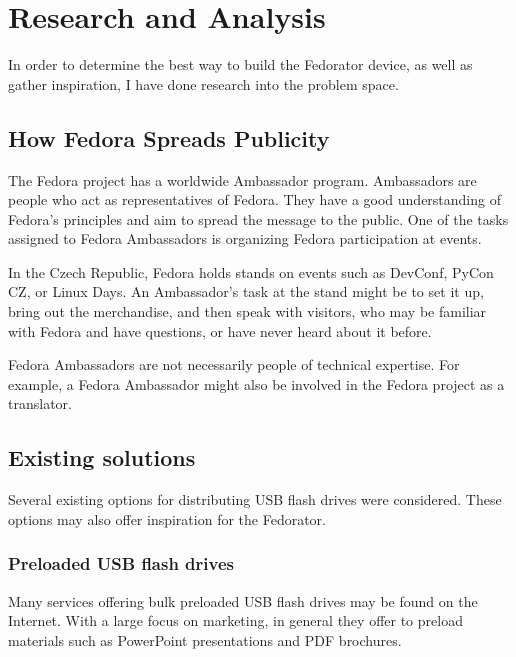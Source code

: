 \chapter{Research and Analysis}
    In order to determine the best way to build the Fedorator device, as well as gather inspiration, I have done research into the problem space.
    
    \section{How Fedora Spreads Publicity}
        The Fedora project has a worldwide Ambassador program.  Ambassadors are people who act as representatives of Fedora.  They have a good understanding of Fedora's principles and aim to spread the message to the public\cite{fedora-ambassadors}.  One of the tasks assigned to Fedora Ambassadors is organizing Fedora participation at events.
        
        In the Czech Republic, Fedora holds stands on events such as DevConf\cite{devconf}, PyCon CZ\cite{pycon-cz}, or Linux Days\cite{linux-days}.  An Ambassador's task at the stand might be to set it up, bring out the merchandise, and then speak with visitors, who may be familiar with Fedora and have questions, or have never heard about it before.
        
        Fedora Ambassadors are not necessarily people of technical expertise.  For example, a Fedora Ambassador might also be involved in the Fedora project as a translator.
        
    \section{Existing solutions}
        Several existing options for distributing USB flash drives were considered.  These options may also offer inspiration for the Fedorator.
        
        \subsection{Preloaded USB flash drives}
            Many services offering bulk preloaded USB flash drives may be found on the Internet.  With a large focus on marketing, in general they offer to preload materials such as PowerPoint presentations and PDF brochures\cite{flashbay-data-preloading}.
            
